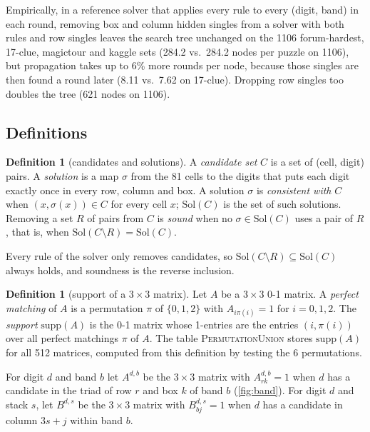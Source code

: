 \documentclass[11pt]{article}
\theoremstyle{definition}
\newtheorem{definition}[theorem]{Definition}
\theoremstyle{plain}
\let\origtextsc\textsc
\renewcommand{\textsc}[1]{\textup{\origtextsc{#1}}}
\begin{document}
Empirically, in a reference solver that applies every rule to every (digit, band) in each round, removing box and
column hidden singles from a solver with both rules and row singles leaves the search tree unchanged on the 1106
forum-hardest, 17-clue, magictour and kaggle sets (284.2 vs.\ 284.2 nodes per puzzle on 1106), but propagation takes
up to 6\% more rounds per node, because those singles are then found a round later (8.11 vs.\ 7.62 on 17-clue).
Dropping row singles too doubles the tree (621 nodes on 1106).

\subsection{Definitions}

\begin{definition}[candidates and solutions]
A \emph{candidate set} $C$ is a set of (cell, digit) pairs. A \emph{solution} is a map $\sigma$ from the 81 cells to the
digits that puts each digit exactly once in every row, column and box. A solution $\sigma$ is \emph{consistent with}
$C$ when $(x,\sigma(x))\in C$ for every cell $x$; $\mathrm{Sol}(C)$ is the set of such solutions. Removing a set $R$ of
pairs from $C$ is \emph{sound} when no $\sigma\in\mathrm{Sol}(C)$ uses a pair of $R$, that is, when
$\mathrm{Sol}(C\setminus R)=\mathrm{Sol}(C)$.
\end{definition}

Every rule of the solver only removes candidates, so $\mathrm{Sol}(C\setminus R)\subseteq\mathrm{Sol}(C)$ always holds, and
soundness is the reverse inclusion.

\begin{definition}[support of a $3\times 3$ matrix]
Let $A$ be a $3\times 3$ 0-1 matrix. A \emph{perfect matching} of $A$ is a permutation $\pi$ of $\{0,1,2\}$ with
$A_{i\pi(i)}=1$ for $i=0,1,2$. The \emph{support} $\mathrm{supp}(A)$ is the 0-1 matrix whose 1-entries are the entries
$(i,\pi(i))$ over all perfect matchings $\pi$ of $A$. The table \textsc{PermutationUnion} stores $\mathrm{supp}(A)$ for all
512 matrices, computed from this definition by testing the 6 permutations.
\end{definition}

For digit $d$ and band $b$ let $A^{d,b}$ be the $3\times 3$ matrix with $A^{d,b}_{rk}=1$ when $d$ has a candidate in
the triad of row $r$ and box $k$ of band $b$ (\cref{fig:band}). For digit $d$ and stack $s$, let $B^{d,s}$ be the
$3\times 3$ matrix with $B^{d,s}_{bj}=1$ when $d$ has a candidate in column $3s+j$ within band $b$.
\end{document}
